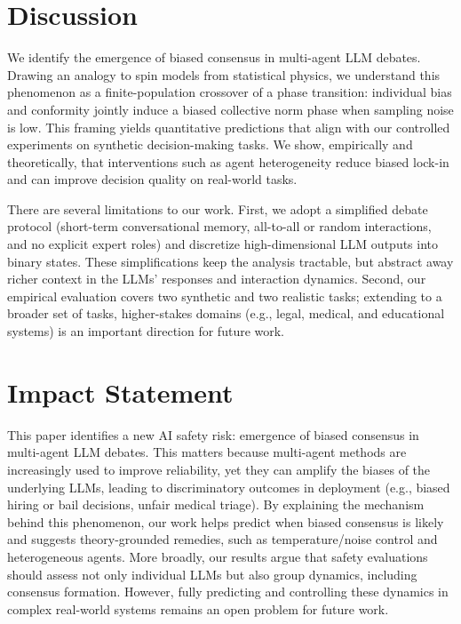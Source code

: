\documentclass{article}
\theoremstyle{plain}
\theoremstyle{definition}
\theoremstyle{remark}
\begin{document}
\section{Discussion}
We identify the emergence of biased consensus in multi-agent LLM debates. 
Drawing an analogy to spin models from statistical physics, we understand this phenomenon as a finite-population crossover of a phase transition: individual bias and conformity jointly induce a biased collective norm phase when sampling noise is low. 
This framing yields quantitative predictions that align with our controlled experiments on synthetic decision-making tasks. 
We show, empirically and theoretically, that interventions such as agent heterogeneity reduce biased lock-in and can improve decision quality on real-world tasks. 

There are several limitations to our work. First, we adopt a simplified debate protocol (short-term conversational memory, all-to-all or random interactions, and no explicit expert roles) and discretize high-dimensional LLM outputs into binary states. These simplifications keep the analysis tractable, but abstract away richer context in the LLMs' responses and interaction dynamics. Second, our empirical evaluation covers two synthetic and two realistic tasks; extending to a broader set of tasks, higher-stakes domains (e.g., legal, medical, and educational systems) is an important direction for future work. 



\clearpage


\section*{Impact Statement}
This paper identifies a new AI safety risk: emergence of biased consensus in multi-agent LLM debates. This matters because multi-agent methods are increasingly used to improve reliability, 
yet they can amplify the biases of the underlying LLMs, leading to discriminatory outcomes in deployment (e.g., biased hiring or bail decisions, unfair medical triage). 
By explaining the mechanism behind this phenomenon, our work helps predict when biased consensus is likely and suggests theory-grounded remedies, such as temperature/noise control and heterogeneous agents. More broadly, our results argue that safety evaluations should assess not only individual LLMs but also group dynamics, including consensus formation. However, fully predicting and controlling these dynamics in complex real-world systems remains an open problem for future work. 
\end{document}
